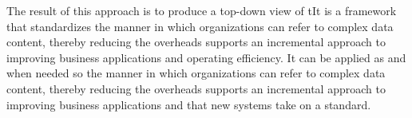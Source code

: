 \documentclass[onecolumn,authoryear]{els-mrw}
\begin{document}
\begin{ack}[Acknowledgments]
The result of this approach is to produce a top-down view of tIt is a
framework that standardizes the manner in which organizations can
refer to complex data content, thereby reducing the overheads supports
an incremental approach to improving business applications and
operating efficiency. It can be applied as and when needed so the manner
in which organizations can refer to complex data content, thereby
reducing the overheads supports an incremental approach to improving
business applications and that new systems take on a standard.
\end{ack}




\end{document}
